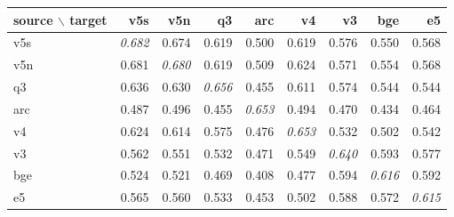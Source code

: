 \begin{tabular}{lrrrrrrrr}
\toprule
source $\backslash$ target & v5s & v5n & q3 & arc & v4 & v3 & bge & e5 \\
\midrule
v5s & \textit{0.682} & 0.674 & 0.619 & 0.500 & 0.619 & 0.576 & 0.550 & 0.568 \\
v5n & 0.681 & \textit{0.680} & 0.619 & 0.509 & 0.624 & 0.571 & 0.554 & 0.568 \\
q3 & 0.636 & 0.630 & \textit{0.656} & 0.455 & 0.611 & 0.574 & 0.544 & 0.544 \\
arc & 0.487 & 0.496 & 0.455 & \textit{0.653} & 0.494 & 0.470 & 0.434 & 0.464 \\
v4 & 0.624 & 0.614 & 0.575 & 0.476 & \textit{0.653} & 0.532 & 0.502 & 0.542 \\
v3 & 0.562 & 0.551 & 0.532 & 0.471 & 0.549 & \textit{0.640} & 0.593 & 0.577 \\
bge & 0.524 & 0.521 & 0.469 & 0.408 & 0.477 & 0.594 & \textit{0.616} & 0.592 \\
e5 & 0.565 & 0.560 & 0.533 & 0.453 & 0.502 & 0.588 & 0.572 & \textit{0.615} \\
\bottomrule
\end{tabular}